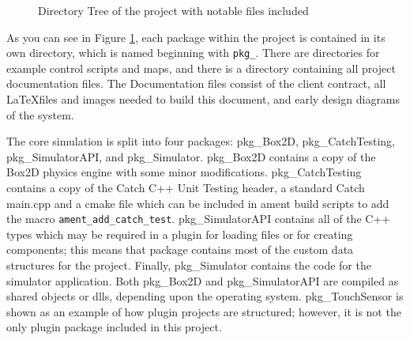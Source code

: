 \begin{figure}
\centering
\begin{subfigure}{0.3\textwidth}
\end{subfigure}
\caption{Directory Tree of the project with notable files included}
\label{fig:dirtree}
\end{figure}

As you can see in Figure \ref{fig:dirtree}, each package within the project is contained in its own directory, which is named beginning with \lstinline|pkg_|. There are directories for example control scripts and maps, and there is a directory containing all project documentation files. The Documentation files consist of the client contract, all \LaTeX files and images needed to build this document, and early design diagrams of the system.

The core simulation is split into four packages: pkg\_Box2D, pkg\_CatchTesting, pkg\_SimulatorAPI, and pkg\_Simulator. pkg\_Box2D contains a copy of the Box2D physics engine with some minor modifications. pkg\_CatchTesting contains a copy of the Catch C++ Unit Testing header, a standard Catch main.cpp and a cmake file which can be included in ament build scripts to add the macro \lstinline|ament_add_catch_test|. pkg\_SimulatorAPI contains all of the C++ types which may be required in a plugin for loading files or for creating components; this means that package contains most of the custom data structures for the project. Finally, pkg\_Simulator contains the code for the simulator application. Both pkg\_Box2D and pkg\_SimulatorAPI are compiled as shared objects or dlls, depending upon the operating system. pkg\_TouchSensor is shown as an example of how plugin projects are structured; however, it is not the only plugin package included in this project.

